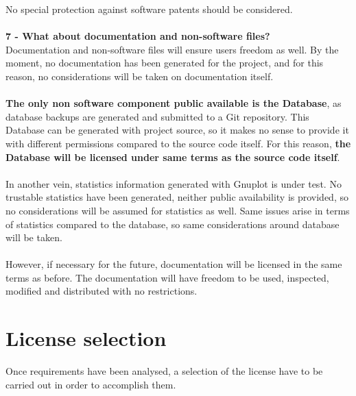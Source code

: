 \documentclass[11pt]{article}
\begin{document}
No special protection against software patents should be considered.\\
\\
\textbf{7 - What about documentation and non-software files?} \\
Documentation and non-software files will ensure users freedom as well. By the moment, no documentation has been generated for the project, and for this reason, no considerations will be taken on documentation itself.\\
\\
\textbf{The only non software component public available is the Database}, as database backups are generated and submitted to a Git repository. This Database can be generated with project source, so it makes no sense to provide it with different permissions compared to the source code itself. For this reason, \textbf{the Database will be licensed under same terms as the source code itself}.\\
\\
In another vein, statistics information generated with Gnuplot is under test. No trustable statistics have been generated, neither public availability is provided, so no considerations will be assumed for statistics as well. Same issues arise in terms of statistics compared to the database, so same considerations around database will be taken. \\
\\
However, if necessary for the future, documentation will be licensed in the same terms as before. The documentation will have freedom to be used, inspected, modified and distributed with no restrictions.
\newpage
\section{License selection}

Once requirements have been analysed, a selection of the license have to be carried out in order to accomplish them.
\end{document}
